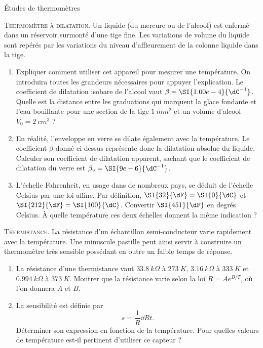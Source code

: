\begin{exo}[MPSI]{Études de thermomètres}

\begin{quest}
\item \textsc{Thermomètre à dilatation.}
Un liquide (du mercure ou de l'alcool) est enfermé dans un réservoir surmonté d'une tige fine. Les variations de volume du liquide sont repérés par les variations du niveau d'affleurement de la colonne liquide dans la tige.
\begin{enumerate}
\item Expliquer comment utiliser cet appareil pour mesurer une température. On introduira toutes les grandeurs nécessaires pour appuyer l'explication. Le coefficient de dilatation isobare de l'alcool vaut $\beta=\SI{1.00e-4}{\dC^{-1}}$. Quelle est la distance entre les graduations qui marquent la glace fondante et l'eau bouillante pour une section de la tige $\SI{1}{mm^2}$ et un volume d'alcool $V_0 =\SI{2}{cm^3}$ ?
\item En réalité, l'enveloppe en verre se dilate également avec la température. Le coefficient $\beta$ donné ci-dessus représente donc la dilatation absolue du liquide. Calculer son coefficient de dilatation apparent, sachant que le coefficient de dilatation du verre est $\beta_v = \SI{9e-6}{\dC^{-1}}$.
\item L'échelle Fahrenheit, en usage dans de nombreux pays, se déduit de l'échelle Celsius par une loi affine. Par définition, $\SI{32}{\dF}=\SI{0}{\dC}$ et $\SI{212}{\dF}=\SI{100}{\dC}$. Convertir $\SI{451}{\dF}$ en degrés Celsius. À quelle température ces deux échelles donnent la même indication ?
\end{enumerate}

\item \textsc{Thermistance.}
La résistance d'un échantillon semi-conducteur varie rapidement avec la température. Une minuscule pastille peut ainsi servir à construire un thermomètre très sensible possédant en outre un faible temps de réponse.

\begin{enumerate}
\item La résistance d'une thermistance vaut $\SI{33.8}{k\Omega}$ à $\SI{273}{K}$, $\SI{3.16}{k\Omega}$ à $\SI{333}{K}$ et $\SI{0.994}{k\Omega}$ à $\SI{373}{K}$. Montrer que la résistance varie selon la loi $R=Ae^{B/T}$, où l'on donnera $A$ et $B$.
\item La sensibilité est définie par
\begin{equation}
s = \dfrac{1}{R} \dd{R}{t}.
\end{equation}
Déterminer son expression en fonction de la température. Pour quelles valeurs de température est-il pertinent d'utiliser ce capteur ?
\end{enumerate}

\end{quest}


\end{exo}

